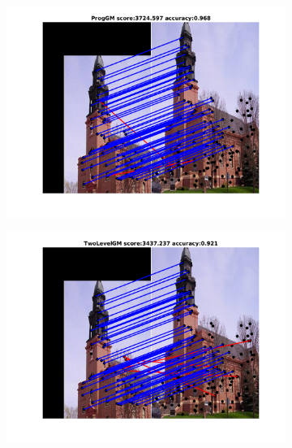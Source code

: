 \begin{figure}[h]
	\begin{subfigure}[b]{0.33\textwidth}
		\centering
		\includegraphics[scale=0.25]{"chapter3/fig/ImageTrafo/anchor_descr/using_cpd_afftrafo/fi_4_ProgGM"} 
	\end{subfigure}%
	\begin{subfigure}[b]{0.33\textwidth}
		\centering
		\includegraphics[scale=0.25]{"chapter3/fig/ImageTrafo/anchor_descr/using_cpd_afftrafo/fi_4_TwoLevelGM"} 
	\end{subfigure} 
	\begin{subfigure}[b]{0.33\textwidth}
		\centering

\end{subfigure}
\end{figure}

